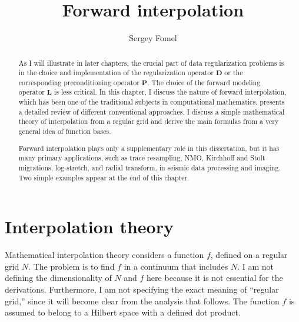
\title{Forward interpolation}


\author{Sergey Fomel}

\newtheorem{property}{Property}

\maketitle

\label{chapter:forwd}

\begin{abstract}
As I will illustrate in later chapters, the crucial part of data
regularization problems is in the choice and implementation of the
regularization operator $\mathbf{D}$ or the corresponding
preconditioning operator $\mathbf{P}$. The choice of the forward
modeling operator $\mathbf{L}$ is less critical. In this chapter, I
discuss the nature of forward interpolation, which has been one of the
traditional subjects in computational mathematics. \cite{wolberg}
presents a detailed review of different conventional approaches. I
discuss a simple mathematical theory of interpolation from a regular
grid and derive the main formulas from a very general idea of function
bases.

Forward interpolation plays only a supplementary role in this
dissertation, but it has many primary applications, such as trace
resampling, NMO, Kirchhoff and Stolt migrations, log-stretch, and
radial transform, in seismic data processing and imaging. Two simple
examples appear at the end of this chapter.
\end{abstract}

\section{Interpolation theory}

Mathematical interpolation theory considers a function $f$, defined on
a regular grid $N$. The problem is to find $f$ in a continuum that
includes $N$. I am not defining the dimensionality of $N$ and $f$ here
because it is not essential for the derivations.  Furthermore, I am
not specifying the exact meaning of ``regular grid,'' since it will
become clear from the analysis that follows. The function $f$ is
assumed to belong to a Hilbert space with a defined dot product.


